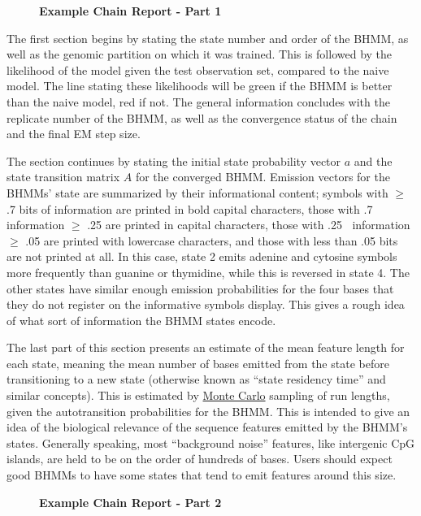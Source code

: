 \begin{figure}[!h]
    \caption{{\bf Example \protect{} Chain Report - Part 1}}
    \label{chreport1}
\end{figure}

The first  section begins by stating the state number and order of the BHMM, as well as the genomic partition on which it was trained. This is followed by the likelihood of the model given the test observation set, compared to the naive model. The line stating these likelihoods will be green if the BHMM is better than the naive model, red if not. The general information concludes with the replicate number of the BHMM, as well as the convergence status of the chain and the final EM step size.

The section continues by stating the initial state probability vector $a$ and the state transition matrix $A$ for the converged BHMM. Emission vectors for the BHMMs' state are summarized by their informational content; symbols with $\geq$ .7 bits of information are printed in bold capital characters, those with .7 $\>$ information $\geq$ .25 are printed in capital characters, those with .25 $\>$ information $\geq$ .05 are printed with lowercase characters, and those with less than .05 bits are not printed at all. In this case, state 2 emits adenine and cytosine symbols more frequently than guanine or thymidine, while this is reversed in state 4. The other states have similar enough emission probabilities for the four bases that they do not register on the informative symbols display. This gives a rough idea of what sort of information the BHMM states encode.

The last part of this section presents an estimate of the mean feature length for each state, meaning the mean number of bases emitted from the state before transitioning to a new state (otherwise known as ``state residency time'' and similar concepts). This is estimated by \hyperref[ssec:MonteCarlo]{Monte Carlo} sampling of run lengths, given the autotransition probabilities for the BHMM. This is intended to give an idea of the biological relevance of the sequence features emitted by the BHMM's states. Generally speaking, most ``background noise'' features, like intergenic CpG islands, are held to be on the order of hundreds of bases. Users should expect good BHMMs to have some states that tend to emit features around this size.

\begin{figure}[!h]
    \caption{{\bf Example \protect{} Chain Report - Part 2}}
    \label{chreport2}
\end{figure}

